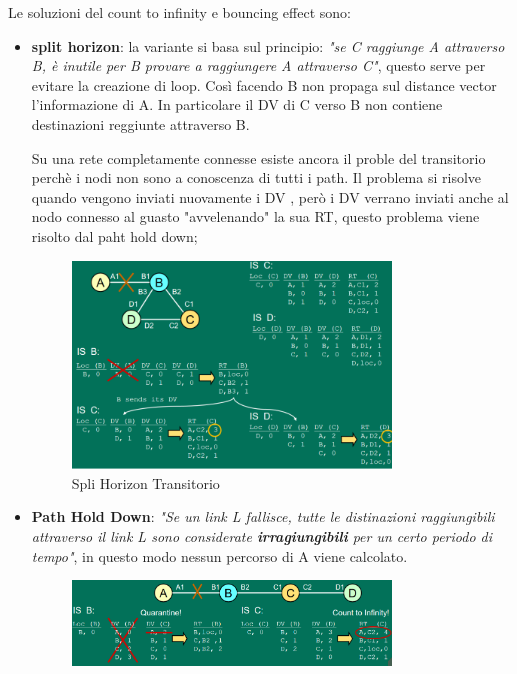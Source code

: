 \documentclass[12pt]{article}
\begin{document}
Le soluzioni del count to infinity e bouncing effect sono:
\begin{itemize}
    \item \textbf{split horizon}: la variante si basa sul principio: \emph{"se C raggiunge A attraverso B, \`e inutile per B provare a raggiungere A attraverso C"}, questo serve per evitare la creazione di loop. Cos\`i facendo B non propaga sul distance vector l'informazione di A. In particolare il DV di C verso B non contiene destinazioni reggiunte attraverso B.

        Su una rete completamente connesse esiste ancora il proble del transitorio perch\`e i nodi non sono a conoscenza di tutti i path. Il problema si risolve quando vengono inviati nuovamente i DV , per\`o i DV verrano inviati anche al nodo connesso al guasto "avvelenando" la sua RT, questo problema viene risolto dal paht hold down;
        \begin{figure}[H]
            \centering
            \includegraphics[width=0.8\textwidth]{spli-horizon-transitorio.png}
            \caption{Spli Horizon Transitorio}
            \label{fig:spli-horizon-transitorio}
        \end{figure}
    \item \textbf{Path Hold Down}: \emph{"Se un link L fallisce, tutte le distinazioni raggiungibili attraverso il link L sono considerate \textbf{irragiungibili} per un certo periodo di tempo"}, in questo modo nessun percorso di A viene calcolato.
        \begin{figure}[H]
            \centering
            \includegraphics[width=0.8\textwidth]{path-hold-down.png}

\end{figure}
\end{itemize}
\end{document}
